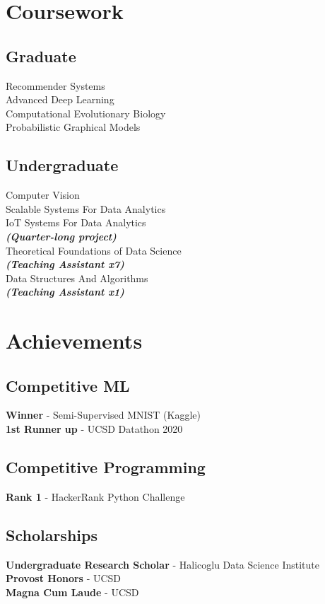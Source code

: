 \documentclass[]{deedy-resume-openfont}
\begin{document}
\begin{minipage}[t]{0.33\textwidth}
\section{Coursework}
\subsection{Graduate}
Recommender Systems\\
Advanced Deep Learning\\
Computational Evolutionary Biology\\
Probabilistic Graphical Models\\
\sectionsep

\subsection{Undergraduate}
Computer Vision\\
Scalable Systems For Data Analytics\\
IoT Systems For Data Analytics\\
{\footnotesize \textit{\textbf{(Quarter-long project) }}} \\
Theoretical Foundations of Data Science\\
{\footnotesize \textit{\textbf{(Teaching Assistant x7) }}} \\
Data Structures And Algorithms\\
{\footnotesize \textit{\textbf{(Teaching Assistant x1) }}} \\

\sectionsep

\section{Achievements}
\subsection{Competitive ML}
\textbf{Winner} - Semi-Supervised MNIST (Kaggle)\\
\textbf{1st Runner up} - UCSD Datathon 2020\\

\sectionsep
\subsection{Competitive Programming}
\textbf{Rank 1} - HackerRank Python Challenge

\sectionsep
\subsection{Scholarships}
\textbf{Undergraduate Research Scholar} - Halicoglu Data Science Institute\\
\textbf{Provost Honors} - UCSD\\
\textbf{Magna Cum Laude} - UCSD


\end{minipage}
\end{document}
